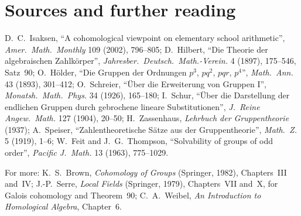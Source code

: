 \section*{Sources and further reading}

D.~C.~Isaksen, ``A cohomological viewpoint on elementary school arithmetic'', \emph{Amer.\ Math.\ Monthly} 109 (2002), 796--805; D.~Hilbert, ``Die Theorie der algebraischen Zahlkörper'', \emph{Jahresber.\ Deutsch.\ Math.-Verein.} 4
(1897), 175--546, Satz~90; O.~Hölder, ``Die Gruppen der Ordnungen $p^3$, $pq^2$, $pqr$, $p^4$'', \emph{Math.\ Ann.} 43 (1893), 301--412; O.~Schreier, ``Über die Erweiterung von Gruppen I'', \emph{Monatsh.\ Math.\ Phys.} 34 (1926),
165--180; I.~Schur, ``Über die Darstellung der endlichen Gruppen durch gebrochene lineare Substitutionen'', \emph{J.\ Reine Angew.\ Math.} 127 (1904), 20--50; H.~Zassenhaus, \emph{Lehrbuch der Gruppentheorie} (1937); A.~Speiser, ``Zahlentheoretische Sätze aus der Gruppentheorie'', \emph{Math.\ Z.} 5 (1919), 1--6; W.~Feit and
J.~G.~Thompson, ``Solvability of groups of odd order'', \emph{Pacific J.\ Math.} 13 (1963), 775--1029.

For more: K.~S.~Brown, \emph{Cohomology of Groups} (Springer, 1982), Chapters~III and~IV; J.-P.~Serre, \emph{Local Fields} (Springer, 1979), Chapters~VII and~X, for Galois cohomology and Theorem~90; C.~A.~Weibel,
\emph{An Introduction to Homological Algebra}, Chapter~6.
